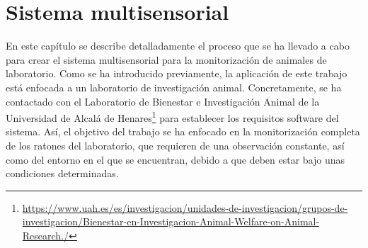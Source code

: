 \chapter{Sistema multisensorial }
\label{cap:capitulo4}



\vspace{1cm}
En este capítulo se describe detalladamente el proceso que se ha llevado a cabo para crear el sistema multisensorial para la monitorización de animales de laboratorio. Como se ha introducido previamente, la aplicación de este trabajo está enfocada a un laboratorio de investigación animal. Concretamente, se ha contactado con el Laboratorio de Bienestar e Investigación Animal de la Universidad de Alcalá de Henares\footnote{\url{https://www.uah.es/es/investigacion/unidades-de-investigacion/grupos-de-investigacion/Bienestar-en-Investigacion-Animal-Welfare-on-Animal-Research./}} para establecer los requisitos software del sistema. Así, el objetivo del trabajo se ha enfocado en la monitorización completa de los ratones del laboratorio, que requieren de una observación constante, así como del entorno en el que se encuentran, debido a que deben estar bajo unas condiciones determinadas.\\

